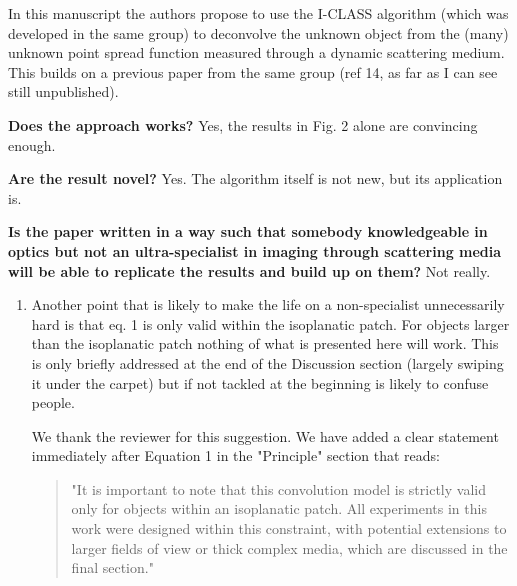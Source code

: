 \documentclass[12pt]{article}
\newenvironment{reviewercomment}
    {\begin{tcolorbox}[width=\linewidth,colback=gray!5,colframe=commentcolor!50,title=Reviewer Comment,left=5pt,right=5pt]}
    {\end{tcolorbox}}
\newenvironment{solved_reviewercomment}
    {\begin{tcolorbox}[width=\linewidth,colback=gray!5,colframe=solved_commentcolor!50,title=Reviewer Comment,left=5pt,right=5pt]}
    {\end{tcolorbox}}
\newenvironment{ourresponse}
    {\begin{tcolorbox}[width=\linewidth,breakable,enhanced,colback=gray!5,colframe=responsecolor!50,title=Response,left=5pt,right=5pt]}
    {\end{tcolorbox}}
\begin{document}
In this manuscript the authors propose to use the I-CLASS algorithm (which was developed in the same group) to deconvolve the unknown object from the (many) unknown point spread function measured through a dynamic scattering medium. This builds on a previous paper from the same group (ref 14, as far as I can see still unpublished).

\textbf{Does the approach works?} Yes, the results in Fig. 2 alone are convincing enough.

\textbf{Are the result novel?} Yes. The algorithm itself is not new, but its application is.

\textbf{Is the paper written in a way such that somebody knowledgeable in optics but not an ultra-specialist in imaging through scattering media will be able to replicate the results and build up on them?} Not really. 
\begin{enumerate}[label=\arabic*.]

    \begin{reviewercomment}
        The main culprit is that the whole CRT-CLASS/I-CLASS are not well-known algorithms, and the only reference given to readers to make themselves familiar with them is not self-contained. \textbf{This has a very easy fix:} add a section in the supplementary information with an explanation of how and why the algorithm works (there is no space restriction there, so there is also no excuse to provide the necessary information).
    \end{reviewercomment}
    \begin{ourresponse}
        \textbf{[Benzy initial]:}
        SABABA
    \end{ourresponse}

    \item \leavevmode\vspace{-\baselineskip}
    \begin{solved_reviewercomment}
        Another point that is likely to make the life on a non-specialist unnecessarily hard is that eq. 1 is only valid within the isoplanatic patch. For objects larger than the isoplanatic patch nothing of what is presented here will work. This is only briefly addressed at the end of the Discussion section (largely swiping it under the carpet) but if not tackled at the beginning is likely to confuse people.
        
    \end{solved_reviewercomment}
    \begin{ourresponse}
        We thank the reviewer for this suggestion. 
        We have added a clear statement immediately after Equation 1 in the "Principle" section that reads:
        \begin{quote}
            "It is important to note that this convolution model is strictly valid only for objects within an isoplanatic patch. All experiments in this work were designed within this constraint, with potential extensions to larger fields of view or thick complex media, which are discussed in the final section."
        \end{quote}
        

\end{ourresponse}
\end{enumerate}
\end{document}
